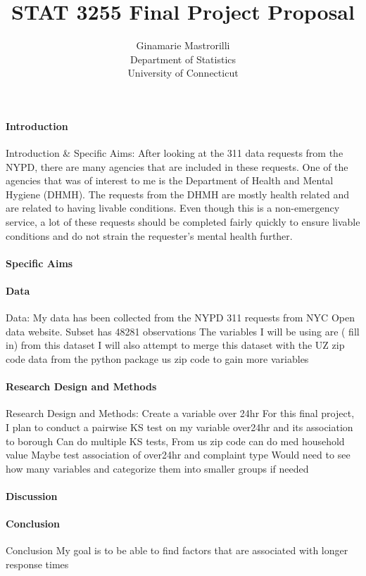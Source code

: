 \documentclass[12pt]{article}
\title{STAT 3255 Final Project Proposal }
\author{Ginamarie Mastrorilli\\
  Department of Statistics\\
  University of Connecticut
}
\begin{document}
\maketitle


\paragraph{Introduction}


Introduction & Specific Aims: After looking at  the 311 data requests from the NYPD, there are many agencies that are included in these requests. 
One of the agencies that was of interest to me is the Department of Health and Mental Hygiene (DHMH). The requests from the DHMH are mostly health related and are related to having livable conditions.
Even though this is a non-emergency service, a lot of these requests should be completed fairly quickly to ensure livable conditions and do not strain the requester's mental health further.


\paragraph{Specific Aims}

\paragraph{Data}

Data: 
My data has been collected from the NYPD 311 requests from NYC Open data website. 
Subset has 48281 observations
The variables I will be using are ( fill in) from this dataset
I will also attempt to merge this dataset with the UZ zip code data from the python package us zip code to gain more variables 



\paragraph{Research Design and Methods}
Research Design and Methods: 
Create a variable over 24hr 
For this final project, I plan to conduct a pairwise KS test on my variable over24hr and its association to borough 
Can do multiple KS tests,
From us zip code can do med household value
Maybe test association of over24hr and complaint type
Would need to see how many variables and categorize them into smaller groups if needed




\paragraph{Discussion}


\paragraph{Conclusion}


Conclusion
My goal is to be able to find factors that are associated with longer response times 




\end{document}
